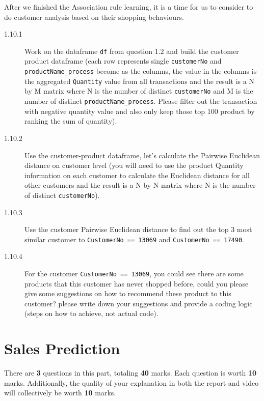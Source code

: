 \documentclass[a4paper]{article}
\begin{document}
    \begin{answer}[Question 1.10]
     After we finished the Association rule learning, it is a time for us to consider to do customer analysis based on their shopping behaviours.

     \begin{description}
         \item[1.10.1]  Work on the dataframe \texttt{df} from question 1.2 and build the customer product dataframe (each row represents single \texttt{customerNo} and \texttt{productName_process} become as the columns, the value in the columns is the aggregated \texttt{Quantity} value from all transactions and the result is a N by M matrix where N is the number of distinct \texttt{customerNo} and M is the number of distinct \texttt{productName_process}. Please filter out the transaction with negative quantity value and also only keep those top 100 product by ranking the sum of quantity).

         \item[1.10.2] Use the customer-product dataframe, let's calculate the Pairwise Euclidean distance on customer level (you will need to use the product Quantity information on each customer to calculate the Euclidean distance for all other customers and the result is a N by N matrix where N is the number of distinct \texttt{customerNo}).

         \item[1.10.3]  Use the customer Pairwise Euclidean distance to find out the top 3 most similar customer to \texttt{CustomerNo == 13069} and \texttt{CustomerNo == 17490}.

         \item[1.10.4]  For the customer \texttt{CustomerNo == 13069}, you could see there are some products that this customer has never shopped before, could you please give some suggestions on how to recommend these product to this customer? please write down your suggestions and provide a coding logic (steps on how to achieve, not actual code).
     \end{description}
    \end{answer}

    \part{Sales Prediction}\label{sec:part2}

    There are \textbf{3} questions in this part,
    totaling \textbf{40} marks.
    Each question is worth \textbf{10} marks.
    Additionally,
    the quality of your explanation in both the report and video will collectively be worth \textbf{10} marks.
\end{document}
